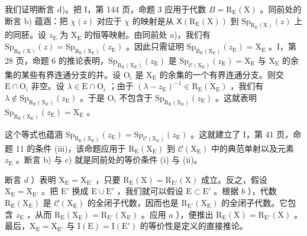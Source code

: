 我们证明断言 d)。把 I，第 144 页，命题 3 应用于代数 \(B = \mathrm{R}_{\mathrm{E}}(\mathrm{X})\) 。同前处的断言 b) 蕴涵：把 \(\chi(z)\) 对应于 \(\chi\) 的映射是从 \(\mathsf{X}(\mathrm{R}_{\mathrm{E}}(\mathrm{X}))\) 到 \(\mathrm{Sp}_{\mathrm{R}_{\mathrm{E}}(\mathrm{X})}(z)\) 上的同胚。设 \(z_{\mathrm{E}}\) 为 \(\mathrm{X}_{\mathrm{E}}\) 的恒等映射。由同前处 a)，我们有 \(\mathrm{Sp}_{\mathrm{R}_{\mathrm{E}}(\mathrm{X})}(z) = \mathrm{Sp}_{\mathrm{R}_{\mathrm{E}}(\mathrm{X}_{\mathrm{E}})}(z_{\mathrm{E}})\) 。因此只需证明 \(\mathrm{Sp}_{\mathrm{R}_{\mathrm{E}}(\mathrm{X}_{\mathrm{E}})}(z_{\mathrm{E}}) = \mathrm{X}_{\mathrm{E}}\) 。I，第 28 页，命题 6 的推论表明，\(\mathrm{Sp}_{\mathrm{R}_{\mathrm{E}}(\mathrm{X}_{\mathrm{E}})}(z_{\mathrm{E}})\) 是 \(\mathrm{Sp}_{\mathcal{C}(\mathrm{X}_{\mathrm{E}})}(z_{\mathrm{E}}) = \mathrm{X}_{\mathrm{E}}\) 与 \(\mathrm{X}_{\mathrm{E}}\) 的余集的某些有界连通分支的并。设 \(\mathrm{O}_{i}\) 是 \(\mathrm{X}_{\mathrm{E}}\) 的余集的一个有界连通分支。则交 \(\mathrm{E} \cap \mathrm{O}_{i}\) 非空。设 \(\lambda \in \mathrm{E} \cap \mathrm{O}_{i}\) ；由于 \((\lambda - z_{\mathrm{E}})^{-1} \in \mathrm{R}_{\mathrm{E}}(\mathrm{X}_{\mathrm{E}})\) ，我们有 \(\lambda \notin \mathrm{Sp}_{\mathrm{R}_{\mathrm{E}}(\mathrm{X}_{\mathrm{E}})}(z_{\mathrm{E}})\) 。于是 \(\mathrm{O}_{i}\) 不包含于 \(\mathrm{Sp}_{\mathrm{R}_{\mathrm{E}}(\mathrm{X}_{\mathrm{E}})}(z_{\mathrm{E}})\) 。这就表明 \(\mathrm{Sp}_{\mathrm{R}_{\mathrm{E}}(\mathrm{X}_{\mathrm{E}})}(z_{\mathrm{E}}) = \mathrm{X}_{\mathrm{E}}\) 。

这个等式也蕴涵 \(\mathrm{Sp}_{\mathrm{R}_{\mathrm{E}}(\mathrm{X}_{\mathrm{E}})}(z_{\mathrm{E}})=\mathrm{Sp}_{\mathcal{C}(\mathrm{X}_{\mathrm{E}})}(z_{\mathrm{E}})\) 。这就建立了 I，第 41 页，命题 11 的条件 (iii)，该命题应用于 \(\mathrm{R}_{\mathrm{E}}(\mathrm{X}_{\mathrm{E}})\) 到 \(\mathcal{C}(\mathrm{X}_{\mathrm{E}})\) 中的典范单射以及元素 \(z_{\mathrm{E}}\) 。断言 b) 与 c) 就是同前处的等价条件 (i) 与 (ii)。

断言 \(d\) ）表明 \(\mathrm{X}_{\mathrm{E}} = \mathrm{X}_{\mathrm{E}'}\) ，只要 \(\mathrm{R}_{\mathrm{E}}(\mathrm{X}) = \mathrm{R}_{\mathrm{E}'}(\mathrm{X})\) 成立。反之，假设 \(\mathrm{X}_{\mathrm{E}} = \mathrm{X}_{\mathrm{E}'}\) 。把 \(\mathrm{E}'\) 换成 \(\mathrm{E} \cup \mathrm{E}'\) ，我们就可以假设 \(\mathrm{E} \subset \mathrm{E}'\) 。根据 \(b\) ），代数 \(\mathrm{R}_{\mathrm{E}}(\mathrm{X}_{\mathrm{E}})\) 是 \(\mathcal{C}(\mathrm{X}_{\mathrm{E}})\) 的全闭子代数，因而也是 \(\mathrm{R}_{\mathrm{E}'}(\mathrm{X}_{\mathrm{E}})\) 的全闭子代数。它包含 \(z_{\mathrm{E}}\) ，从而 \(\mathrm{R}_{\mathrm{E}}(\mathrm{X}_{\mathrm{E}}) = \mathrm{R}_{\mathrm{E}'}(\mathrm{X}_{\mathrm{E}})\) 。应用 \(a\) ），便推出 \(\mathrm{R}_{\mathrm{E}}(\mathrm{X}) = \mathrm{R}_{\mathrm{E}'}(\mathrm{X})\) 。最后，\(\mathrm{X}_{\mathrm{E}} = \mathrm{X}_{\mathrm{E}'}\) 与 \(\mathrm{I}(\mathrm{E}) = \mathrm{I}(\mathrm{E}')\) 的等价性是定义的直接推论。

